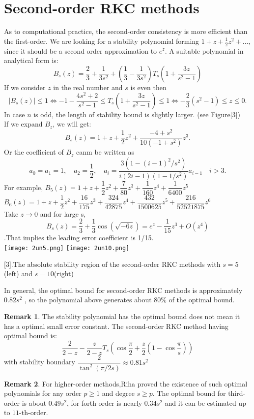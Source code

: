 \documentclass{article}
\theoremstyle{theorem}
\theoremstyle{definition}
\newtheorem*{remark}{Remark}
\begin{document}
	\section{Second-order RKC methods}
	As to computational practice, the second-order consistency is more efficient than the first-order. We are looking for a stability polynomial forming $1+z+\frac{1}{2}z^2+...$, since it should be a second order approximation to $e^z$. A suitable polynomial in analytical form is:
	$$B_s(z)=\frac{2}{3}+\frac{1}{3s^2}+\left(\frac{1}{3}-\frac{1}{3s^2}\right)T_s\left(1+\frac{3z}{s^2-1}\right)$$
	If we consider $z$ in the real number and $s$ is even then $$|B_s(z)| \le 1 \Leftrightarrow -1-\dfrac{4s^2+2}{s^2-1} \le T_s\left(1+\dfrac{3z}{s^2-1}\right) \le 1 \Leftrightarrow -\dfrac{2}{3}(s^2-1) \le z \le 0.$$ In case $n$ is odd, the length of stability bound is slightly larger. (see Figure[3])\\
	If we expand $B_z$, we will get:
	$$B_s(z)=1+z+\frac{1}{2}z^2+\frac{-4+s^2}{10(-1+s^2)}z^3.$$ Or the coefficient of $B_z$ canm be written as $$a_0=a_1=1,\quad a_2=\frac{1}{2}, \quad a_i=\frac{3(1-(i-1)^2/s^2)}{i(2i-1)(1-1/s^2)}a_{i-1} \quad i>3.$$  
	For example, $B_5(z)=1+z+\dfrac{1}{2}z^2+\dfrac{7}{80}z^3+\dfrac{1}{160}z^4+\dfrac{1}{6400}z^5$\\
	$B_6(z)=1+z+\dfrac{1}{2}z^2+\dfrac{16}{175}z^3+\dfrac{324}{42875}z^4+\dfrac{432}{1500625}z^5+\dfrac{216}{52521875}z^6$\\
	Take $z \to 0$ and for large s,  
	$$B_s(z)=\frac{2}{3}+\frac{1}{3} \cos(\sqrt{-6z})=e^z-\frac{1}{15}z^3+O(z^4)$$.That implies the leading error coefficient is 1/15. \\
		\texttt{[image: 2un5.png]}	
	\texttt{[image: 2un10.png]}
	\begin{center}
		\figurename[3]{.The absolute stability region of the second-order RKC methods with $s=5$(left) and $s=10$(right)}
	\end{center} 
	In general, the optimal bound for second-order RKC methods is approximately $0.82s^2$ , so the polynomial above generates about $80\%$ of the optimal bound.
	\begin{remark}
		The stability polynomial has the optimal bound does not mean it has a optimal small error constant. The second-order RKC method having optimal bound is:
		$$\frac{2}{2-z} - \frac{z}{2-z}T_s(\cos \frac{\pi}{2}+\frac{z}{2}(1-\cos \frac{\pi}{s}))$$ with stability boundary $\dfrac{2}{\tan^2(\pi/2s)} \approx 0.81s^2$ 
	\end{remark}
	\begin{remark}
		For higher-order methods,Riha proved the existence of such optimal polynomials for any order $p \ge 1$ and degree $s \ge p$. The optimal bound for  third-order is about $0.49 s^2$, for forth-order is nearly $0.34s^2$ and it can be estimated up to $11$-th-order. 
	\end{remark}
\end{document}
